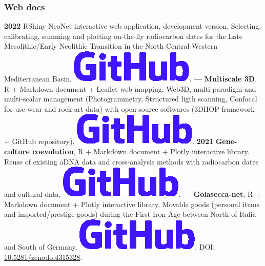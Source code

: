 \documentclass{article}
\begin{document}
\subsubsection*{Web docs}

\textbf{2022 }\textsf{RShiny} NeoNet interactive web application, development version. Selecting, calibrating, summing and plotting on-the-fly radiocarbon dates for the Late Mesolithic/Early Neolithic Transition in the North Central-Western Mediterranean Basin, \href{https://github.com/zoometh/neonet#neonet-app--development-version-}{\includegraphics[scale=0.1]{github-rect.png}}.
\smallbreak
\textbf{--- }\textbf{Multiscale 3D}, \textsf{R} + \textsf{Markdown} document + \textsf{Leaflet} web mapping. Web3D, multi-paradigm and multi-scalar management (Photogrammetry, Structured ligth scanning, Confocal for use-wear and rock-art data) with open-source softwares (\textsf{3DHOP} framework + \textsf{GitHub} repository), \href{https://zoometh.github.io/rockart/}{\includegraphics[scale=0.1]{github-rect.png}}.
\smallbreak
\textbf{2021 }\textbf{Gene-culture coevolution}, \textsf{R} + \textsf{Markdown} document + \textsf{Plotly} interactive library. Reuse of existing aDNA data and cross-analysis methods with radiocarbon dates and cultural data, \href{https://zoometh.github.io/aDNA/}{\includegraphics[scale=0.1]{github-rect.png}}.
\smallbreak
\textbf{--- }\textbf{Golasecca-net}, \textsf{R} + \textsf{Markdown} document + \textsf{Plotly} interactive library. Movable goods (personal items and imported/prestige goods) during the First Iron Age between North of Italia and South of Germany, \href{https://zoometh.github.io/golasecca/}{\includegraphics[scale=0.1]{github-rect.png}}, DOI: \href{https://doi.org/10.5281/zenodo.4315328}{10.5281/zenodo.4315328}.
\end{document}
